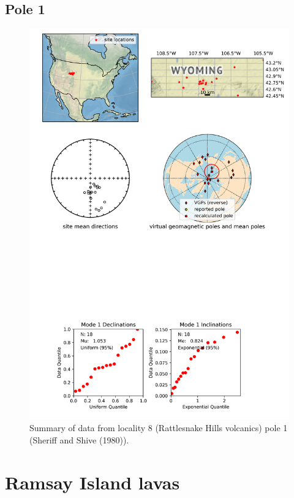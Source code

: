 \documentclass{article}
\begin{document}
\subsection{Pole 1}


\begin{figure}[H]
\centering
\includegraphics[width=5 in]{./8/1/pole_summary.png}
\caption{Summary of data from locality 8 (Rattlesnake Hills volcanics) pole 1 (Sheriff and Shive (1980)).}
\end{figure}

\section{Ramsay Island lavas}
\end{document}
